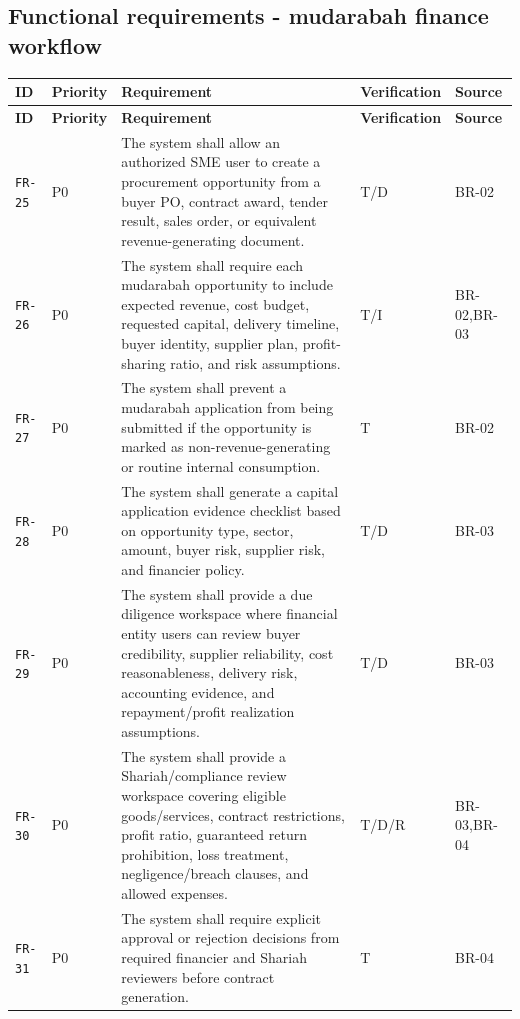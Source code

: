 \documentclass[11pt,a4paper]{article}
\begin{document}
\subsection{Functional requirements - mudarabah finance workflow}\label{sec:fr-mudarabah}
\begin{footnotesize}
\begin{longtable}{@{}p{}p{}p{}p{}p{}@{}}
\rowcolor{gray!18}\textbf{ID} & \textbf{Priority} & \textbf{Requirement} & \textbf{Verification} & \textbf{Source} \\ \hline
\endfirsthead
\rowcolor{gray!18}\textbf{ID} & \textbf{Priority} & \textbf{Requirement} & \textbf{Verification} & \textbf{Source} \\ \hline
\endhead
\texttt{FR-25} & P0 & The system shall allow an authorized SME user to create a procurement opportunity from a buyer PO, contract award, tender result, sales order, or equivalent revenue-generating document. & T/D & BR-02 \\ \hline
\texttt{FR-26} & P0 & The system shall require each mudarabah opportunity to include expected revenue, cost budget, requested capital, delivery timeline, buyer identity, supplier plan, profit-sharing ratio, and risk assumptions. & T/I & BR-02,BR-03 \\ \hline
\texttt{FR-27} & P0 & The system shall prevent a mudarabah application from being submitted if the opportunity is marked as non-revenue-generating or routine internal consumption. & T & BR-02 \\ \hline
\texttt{FR-28} & P0 & The system shall generate a capital application evidence checklist based on opportunity type, sector, amount, buyer risk, supplier risk, and financier policy. & T/D & BR-03 \\ \hline
\texttt{FR-29} & P0 & The system shall provide a due diligence workspace where financial entity users can review buyer credibility, supplier reliability, cost reasonableness, delivery risk, accounting evidence, and repayment/profit realization assumptions. & T/D & BR-03 \\ \hline
\texttt{FR-30} & P0 & The system shall provide a Shariah/compliance review workspace covering eligible goods/services, contract restrictions, profit ratio, guaranteed return prohibition, loss treatment, negligence/breach clauses, and allowed expenses. & T/D/R & BR-03,BR-04 \\ \hline
\texttt{FR-31} & P0 & The system shall require explicit approval or rejection decisions from required financier and Shariah reviewers before contract generation. & T & BR-04 \\ \hline

\end{longtable}
\end{footnotesize}
\end{document}
